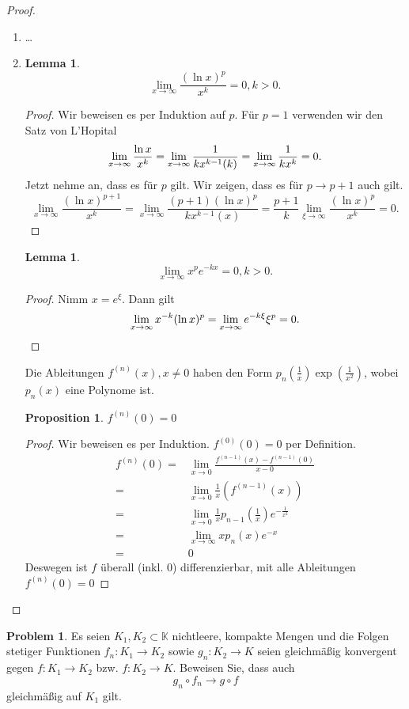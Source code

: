 \documentclass[prb,12pt]{revtex4-2}
\newtheorem{Proposition}[Theorem]{Proposition}
\newtheorem{Lemma}[Theorem]{Lemma}
\theoremstyle{definition}
\newtheorem{Problem}{Problem}
\theoremstyle{definition}
\begin{document}
\begin{proof}
	\begin{enumerate}[label=\roman*)]
		\item \ldots
		\item 
			\begin{Lemma}
				\[
				\lim_{x \to \infty} \frac{(\ln x)^p}{x^k}=0, k > 0
				.\] 
			\end{Lemma}
			\begin{proof}
				Wir beweisen es per Induktion auf $p$. F\"{u}r $p=1$ verwenden wir den Satz von L'Hopital
				\[
					\lim_{x \to \infty} \frac{\ln x}{x^k}=\lim_{x \to \infty} \frac{1}{kx^{k-1}(k)}=\lim_{x \to \infty} \frac{1}{kx^k}=0
				.\qedhere\] 
				Jetzt nehme an, dass es f\"{u}r $p$ gilt. Wir zeigen, dass es f\"{u}r $p\to p+1$ auch gilt. 
				\[
					\lim_{x \to \infty} \frac{(\ln x)^{p+1}}{x^k}=\lim_{x \to \infty} \frac{(p+1)(\ln x)^p}{kx^{k-1}(x)}=\frac{p+1}{k}\lim_{\xi \to \infty} \frac{(\ln x)^p}{x^k}=0
				.\] 
			\end{proof}
			\begin{Lemma}
			\[
				\lim_{x \to \infty} x^p e^{-kx}=0, k>0
			.\] 	
			\end{Lemma}
			\begin{proof}
				Nimm $x=e^\xi$. Dann gilt
				\[
					\lim_{x \to \infty} x^{-k}(\ln x)^p=\lim_{x \to \infty} e^{-k\xi}\xi^p=0
				.\qedhere\] 
			\end{proof}
			Die Ableitungen $f^{(n)}(x), x\neq 0$ haben den Form $p_n\left( \frac{1}{x} \right) \exp\left( \frac{1}{x^2} \right) $, wobei $p_n(x)$ eine Polynome ist. 
			\begin{Proposition}
				$f^{(n)}(0)=0$
			\end{Proposition}
			\begin{proof}
				Wir beweisen es per Induktion. $f^{(0)}(0)=0$ per Definition.
				\begin{align*}
					f^{(n)}(0)=&\lim_{x \to 0} \frac{f^{(n-1)}(x)-f^{(n-1)}(0)}{x-0}\\
					=&\lim_{x \to 0}  \frac{1}{x}\left( f^{(n-1)}(x) \right)\\
					=&\lim_{x \to 0} \frac{1}{x}p_{n-1}\left(\frac{1}{x}\right)e^{-\frac{1}{x^2}}\\
					=&\lim_{x \to \infty} xp_n(x)e^{-x}\\
					=&0
				\end{align*}
				Deswegen ist $f$ überall (inkl. 0) differenzierbar, mit alle Ableitungen $f^{(n)}(0)=0$
			\end{proof}
	\end{enumerate}
\end{proof}
\begin{Problem}
	Es seien $K_1 , K_2 \subset \mathbb{K}$  nichtleere, kompakte Mengen und die Folgen stetiger Funktionen $f_n : K_1 \to K_2$ sowie $g_n : K_2 \to K$  seien gleichmäßig konvergent gegen $f : K_1 \to K_2$ bzw. $f : K_2 \to K$. Beweisen Sie, dass auch
	\[
	g_n\circ f_n \to g \circ f\]
	gleichmäßig auf $K_1$ gilt.
\end{Problem}
\end{document}

